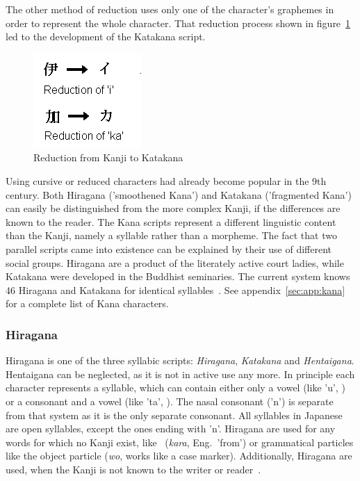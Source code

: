 The other method of reduction uses only one of the character's graphemes in
order to represent the whole character. That reduction process shown in 
figure~\ref{fig:reductiontokatakana} led to the development of the
Katakana script.
\begin{figure}[htbp] 
\begin{center}
\includegraphics[scale=0.7]{images/reductiontokatakana.png}
\caption{Reduction from Kanji to Katakana}
\label{fig:reductiontokatakana}
\end{center}
\end{figure}

Using cursive or reduced characters had already become popular in the 9th 
century.
Both Hiragana ('smoothened Kana') and Katakana ('fragmented Kana') can easily be 
distinguished from the more complex Kanji,
if the differences are known to the reader.
The Kana scripts represent a different linguistic 
content than the Kanji, namely a syllable rather than a morpheme.
The fact that two parallel scripts came into existence can be explained by 
their use of different social groups. Hiragana are a product of the literately 
active court ladies, while Katakana were developed in the Buddhist seminaries.
The current system knows 46 Hiragana and Katakana for identical 
syllables~. See appendix~\ref{sec:app:kana} for a 
complete list of Kana characters.

\subsubsection{Hiragana }
\label{sec:hiragana}

Hiragana is one of the three syllabic scripts: \emph{Hiragana}, \emph{Katakana} 
and \emph{Hentaigana}. Hentaigana can be neglected, as it is not in active use 
any more. %
In principle each character represents a syllable, which can contain either only 
a vowel (like 'u', ) or a consonant and a vowel (like 'ta', ). 
The nasal consonant  ('n') is separate from that system as it is the
only separate consonant. All syllables in Japanese are open syllables, except the
ones ending with 'n'.
Hiragana are used for any words for which no Kanji exist, like 
~(\emph{kara}, Eng.\ 'from') or grammatical particles like the object 
particle  (\emph{wo}, works like a case marker).
Additionally, Hiragana are used, when the Kanji is not known to the writer or 
reader~. 

